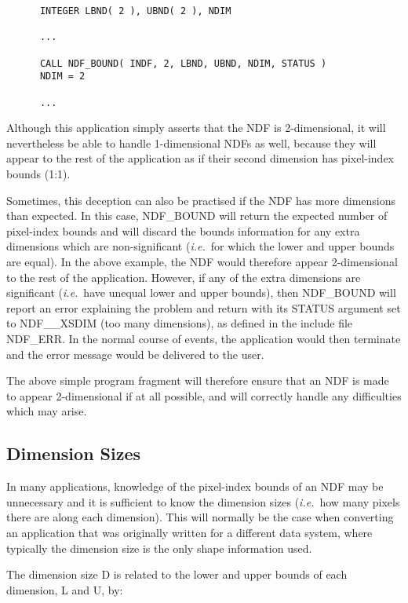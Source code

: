 \documentclass[twoside,11pt]{article}
\newcommand{\xlabel}[1]{}
\newcommand{\st}[1]{{\em{#1}}}
\begin{document}
\small
\begin{verbatim}
      INTEGER LBND( 2 ), UBND( 2 ), NDIM

      ...

      CALL NDF_BOUND( INDF, 2, LBND, UBND, NDIM, STATUS )
      NDIM = 2

      ...
\end{verbatim}
\normalsize

Although this application simply asserts that the NDF is 2-dimensional, it
will nevertheless be able to handle 1-dimensional NDFs as well, because they
will appear to the rest of the application as if their second dimension has
pixel-index bounds (1:1). 

Sometimes, this deception can also be practised if the NDF has more
dimensions than expected. 
In this case, NDF\_BOUND will return the expected number of pixel-index
bounds and will discard the bounds information for any extra dimensions
which are non-significant (\st{i.e.}\ for which the lower and upper bounds
are equal). 
In the above example, the NDF would therefore appear 2-dimensional to the rest
of the application.
However, if any of the extra dimensions are significant (\st{i.e.}\ have
unequal lower and upper bounds), then NDF\_BOUND will report an error
explaining the problem and return with its STATUS argument set to
NDF\_\_XSDIM (too many dimensions), as defined in the include file NDF\_ERR.
In the normal course of events, the application would then terminate and the
error message would be delivered to the user. 

The above simple program fragment will therefore ensure that an NDF is made
to appear 2-dimensional if at all possible, and will correctly handle any
difficulties which may arise. 

\subsection{\xlabel{dimension_sizes}Dimension Sizes}

In many applications, knowledge of the pixel-index bounds of an NDF may be
unnecessary and it is sufficient to know the dimension sizes (\st{i.e.}\ how
many pixels there are along each dimension). 
This will normally be the case when converting an application that was
originally written for a different data system, where typically the dimension
size is the only shape information used. 

The dimension size D is related to the lower and upper bounds of each
dimension, L and U, by: 
\end{document}
